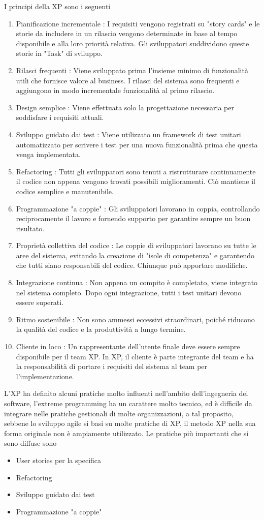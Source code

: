\documentclass[10pt, letterpaper]{report}
\begin{document}
I principi della XP sono i seguenti\begin{enumerate}
    \item Pianificazione incrementale : I requisiti vengono registrati su "story cards" e le storie da includere in un rilascio vengono determinate in base al tempo disponibile e alla loro priorità relativa. Gli sviluppatori suddividono queste storie in "Task" di sviluppo.
    \item Rilasci frequenti : Viene sviluppato prima l'insieme minimo di funzionalità utili che fornisce valore al business. I rilasci del sistema sono frequenti e aggiungono in modo incrementale funzionalità al primo rilascio.
    \item Design semplice : Viene effettuata solo la progettazione necessaria per soddisfare i requisiti attuali.
    \item Sviluppo guidato dai test : Viene utilizzato un framework di test unitari automatizzato per scrivere i test per una nuova funzionalità prima che questa venga implementata.
    \item Refactoring : Tutti gli sviluppatori sono tenuti a ristrutturare continuamente il codice non appena vengono trovati possibili miglioramenti. Ciò mantiene il codice semplice e manutenibile.
    \item Programmazione "a coppie" : Gli sviluppatori lavorano in coppia, controllando reciprocamente il lavoro e fornendo supporto per garantire sempre un buon risultato.
    \item Proprietà collettiva del codice : Le coppie di sviluppatori lavorano su tutte le aree del sistema, evitando la creazione di "isole di competenza" e garantendo che tutti siano responsabili del codice. Chiunque può apportare modifiche.
    \item Integrazione continua : Non appena un compito è completato, viene integrato nel sistema completo. Dopo ogni integrazione, tutti i test unitari devono essere superati.
    \item Ritmo sostenibile : Non sono ammessi eccessivi straordinari, poiché riducono la qualità del codice e la produttività a lungo termine.
    \item Cliente in loco : Un rappresentante dell'utente finale deve essere sempre disponibile per il team XP. In XP, il cliente è parte integrante del team e ha la responsabilità di portare i requisiti del sistema al team per l'implementazione.
\end{enumerate}
L'XP ha definito alcuni pratiche molto influenti nell'ambito dell'ingegneria del software, l'extreme programming ha un carattere molto tecnico, ed è difficile da integrare nelle pratiche gestionali di molte organizzazioni, a tal proposito, sebbene lo sviluppo agile  si basi su molte pratiche di XP, il metodo XP nella sua forma originale non è ampiamente utilizzato. Le pratiche più importanti che si sono diffuse sono\begin{itemize}
    \item User stories per la specifica 
    \item Refactoring
    \item Sviluppo guidato dai test
    \item Programmazione "a coppie"
\end{itemize}
\end{document}
